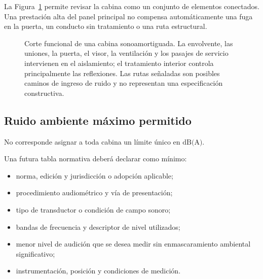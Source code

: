 La Figura~\ref{fig:u9-cabina-sistema} permite revisar la cabina como un
conjunto de elementos conectados. Una prestación alta del panel principal no
compensa automáticamente una fuga en la puerta, un conducto sin tratamiento
o una ruta estructural.

\begin{figure}[htbp]
    \centering
    
    \caption{Corte funcional de una cabina sonoamortiguada. La envolvente,
    las uniones, la puerta, el visor, la ventilación y los pasajes de servicio
    intervienen en el aislamiento; el tratamiento interior controla
    principalmente las reflexiones. Las rutas señaladas son posibles caminos
    de ingreso de ruido y no representan una especificación constructiva.}
    \label{fig:u9-cabina-sistema}
\end{figure}

\subsection{Ruido ambiente máximo permitido}
\label{sec:u9-ruido-cabina}

No corresponde asignar a toda cabina un límite único en
\(\text{dB(A)}\). 

Una futura tabla normativa deberá declarar como mínimo:

\begin{itemize}
    \item norma, edición y jurisdicción o adopción aplicable;
    \item procedimiento audiométrico y vía de presentación;
    \item tipo de transductor o condición de campo sonoro;
    \item bandas de frecuencia y descriptor de nivel utilizados;
    \item menor nivel de audición que se desea medir sin enmascaramiento
    ambiental significativo;
    \item instrumentación, posición y condiciones de medición.
\end{itemize}


